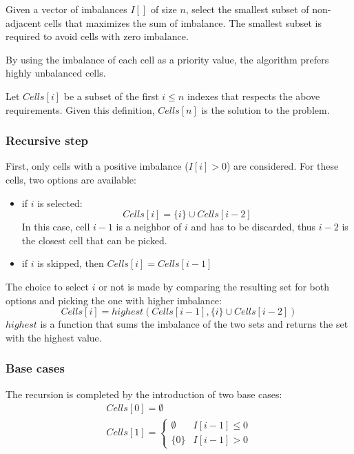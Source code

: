 Given a vector of imbalances $I[]$ of size $n$, select the smallest subset of non-adjacent cells that maximizes the sum of imbalance. The smallest subset is required to avoid cells with zero imbalance.

By using the imbalance of each cell as a priority value, the algorithm prefers highly unbalanced cells.

Let $Cells[i]$ be a subset of the first $i \le n$ indexes that respects the above requirements. Given this definition, $Cells[n]$ is the solution to the problem.

\subsubsection{Recursive step}
First, only cells with a positive imbalance ($I[i] > 0$) are considered. For these cells, two options are available:
\begin{itemize}
    \item if $i$ is selected:
          \[
              Cells[i] = \{i\} \cup Cells[i-2]
          \]
          In this case, cell $i-1$ is a neighbor of $i$ and has to be discarded, thus $i-2$ is the closest cell that can be picked.
    \item if $i$ is skipped, then $Cells[i]=Cells[i-1]$
\end{itemize}
The choice to select $i$ or not is made by comparing the resulting set for both options and picking the one with higher imbalance:
\begin{equation}
    Cells[i] = \mathit{highest}(Cells[i-1], \{i\} \cup Cells[i-2])
\end{equation}
$\mathit{highest}$ is a function that sums the imbalance of the two sets and returns the set with the highest value.

\subsubsection{Base cases}
The recursion is completed by the introduction of two base cases:
\begin{gather}
    Cells[0]=\emptyset \\
    Cells[1]=\begin{cases}
        \emptyset & I[i-1] \leq 0 \\
        \{ 0 \}   & I[i-1] > 0
    \end{cases}
\end{gather}

